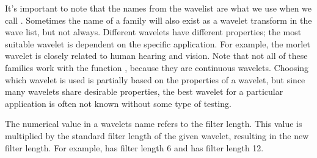 It's important to note that the names from the wavelist are what we use when we call . Sometimes the name of a family will also exist as a wavelet transform in the wave list, but not always.
Different wavelets have different properties; the most suitable wavelet is dependent on the specific application.
For example, the morlet wavelet is closely related to human hearing and vision.
Note that not all of these families work with the function , because they are continuous wavelets.
Choosing which wavelet is used is partially based on the properties of a wavelet, but since many wavelets share desirable properties, the best wavelet for a particular application is often not known without
some type of testing.

\begin{info}
The numerical value in a wavelets name refers to the filter length.
This value is multiplied by the standard filter length of the given wavelet, resulting in the new filter length.
For example,  has filter length 6 and  has filter length 12.
\end{info}

\begin{comment}
\begin{figure}
\begin{subfigure}[b]{0.45\textwidth}
    \texttt{[image: figures/mexicanHat]}
\end{subfigure}
\begin{subfigure}[b]{0.45\textwidth}
    \texttt{[image: figures/db5\_3]}
\end{subfigure}
\caption{Mexican Hat and Daubechies 4 mother wavelets.}
\label{fig:more_wavelets}
\end{figure}
\end{comment}

